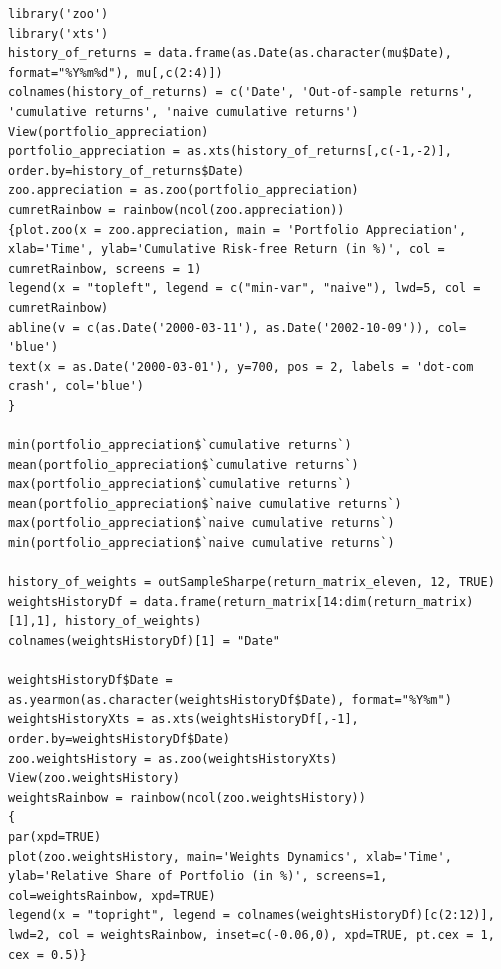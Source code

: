 \begin{lstlisting}[label=code:full-source-code, frame=single]
library('zoo')
library('xts')
history_of_returns = data.frame(as.Date(as.character(mu$Date), format="%Y%m%d"), mu[,c(2:4)])
colnames(history_of_returns) = c('Date', 'Out-of-sample returns', 'cumulative returns', 'naive cumulative returns')
View(portfolio_appreciation)
portfolio_appreciation = as.xts(history_of_returns[,c(-1,-2)], order.by=history_of_returns$Date)
zoo.appreciation = as.zoo(portfolio_appreciation)
cumretRainbow = rainbow(ncol(zoo.appreciation))
{plot.zoo(x = zoo.appreciation, main = 'Portfolio Appreciation', xlab='Time', ylab='Cumulative Risk-free Return (in %)', col = cumretRainbow, screens = 1)
legend(x = "topleft", legend = c("min-var", "naive"), lwd=5, col = cumretRainbow)
abline(v = c(as.Date('2000-03-11'), as.Date('2002-10-09')), col= 'blue')
text(x = as.Date('2000-03-01'), y=700, pos = 2, labels = 'dot-com crash', col='blue')
}

min(portfolio_appreciation$`cumulative returns`)
mean(portfolio_appreciation$`cumulative returns`)
max(portfolio_appreciation$`cumulative returns`)
mean(portfolio_appreciation$`naive cumulative returns`)
max(portfolio_appreciation$`naive cumulative returns`)
min(portfolio_appreciation$`naive cumulative returns`)

history_of_weights = outSampleSharpe(return_matrix_eleven, 12, TRUE)
weightsHistoryDf = data.frame(return_matrix[14:dim(return_matrix)[1],1], history_of_weights)
colnames(weightsHistoryDf)[1] = "Date"

weightsHistoryDf$Date = as.yearmon(as.character(weightsHistoryDf$Date), format="%Y%m")
weightsHistoryXts = as.xts(weightsHistoryDf[,-1], order.by=weightsHistoryDf$Date)
zoo.weightsHistory = as.zoo(weightsHistoryXts)
View(zoo.weightsHistory)
weightsRainbow = rainbow(ncol(zoo.weightsHistory))
{
par(xpd=TRUE)
plot(zoo.weightsHistory, main='Weights Dynamics', xlab='Time', ylab='Relative Share of Portfolio (in %)', screens=1, col=weightsRainbow, xpd=TRUE)
legend(x = "topright", legend = colnames(weightsHistoryDf)[c(2:12)], lwd=2, col = weightsRainbow, inset=c(-0.06,0), xpd=TRUE, pt.cex = 1, cex = 0.5)}
\end{lstlisting}